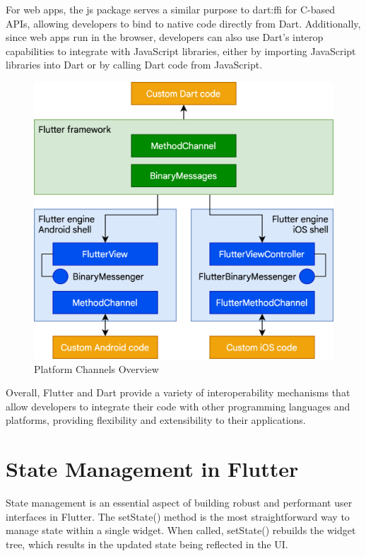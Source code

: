 \documentclass[conference]{IEEEtran}
\begin{document}
For web apps, the js package serves a similar purpose to dart:ffi for C-based APIs, allowing developers to bind to native code directly from Dart. Additionally, since web apps run in the browser, developers can also use Dart's interop capabilities to integrate with JavaScript libraries, either by importing JavaScript libraries into Dart or by calling Dart code from JavaScript.

\begin{figure}[ht]
	\centerline{\includegraphics[width=\linewidth]{figures/platform-channels}}
	\caption{Platform Channels Overview \cite{b1.1}}
	\label{fig:platform-channels}
\end{figure}

Overall, Flutter and Dart provide a variety of interoperability mechanisms that allow developers to integrate their code with other programming languages and platforms, providing flexibility and extensibility to their applications.


\section{State Management in Flutter}
State management is an essential aspect of building robust and performant user interfaces in Flutter. The setState() method is the most straightforward way to manage state within a single widget. When called, setState() rebuilds the widget tree, which results in the updated state being reflected in the UI.
\end{document}

